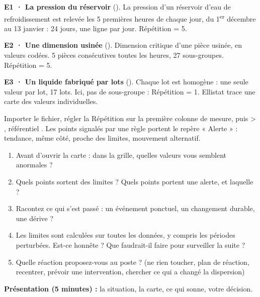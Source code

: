 \documentclass[10pt,a4paper]{article}
\begin{document}
\textbf{E1 · La pression du réservoir} (). La pression d'un réservoir d'eau de refroidissement est relevée les 5 premières heures de chaque jour, du 1\textsuperscript{er} décembre au 13 janvier : 24 jours, une ligne par jour. Répétition = 5.

\textbf{E2 · Une dimension usinée} (). Dimension critique d'une pièce usinée, en valeurs codées. 5 pièces consécutives toutes les heures, 27 sous-groupes. Répétition = 5.

\textbf{E3 · Un liquide fabriqué par lots} (). Chaque lot est homogène : une seule valeur par lot, 17 lots. Ici, pas de sous-groupe : Répétition = 1. Ellistat trace une carte des valeurs individuelles.

\begin{tcolorbox}[pas]
Importer le fichier, régler la Répétition sur la première colonne de mesure, puis  > , référentiel . Les points signalés par une règle portent le repère « Alerte » : tendance, même côté, proche des limites, mouvement alternatif.
\end{tcolorbox}

\begin{enumerate}[label=\textcolor{cyan}{\textbf{Q\arabic*.}},leftmargin=22pt]
\item Avant d'ouvrir la carte : dans la grille, quelles valeurs vous semblent anormales ?\reponse
\item Quels points sortent des limites ? Quels points portent une alerte, et laquelle ?\reponse[2]
\item Racontez ce qui s'est passé : un événement ponctuel, un changement durable, une dérive ?\reponse[2]
\item Les limites sont calculées sur toutes les données, y compris les périodes perturbées. Est-ce honnête ? Que faudrait-il faire pour surveiller la suite ?\reponse[2]
\item Quelle réaction proposez-vous au poste ? (ne rien toucher, plan de réaction, recentrer, prévoir une intervention, chercher ce qui a changé la dispersion)\reponse[2]
\end{enumerate}

\textbf{Présentation (5 minutes) :} la situation, la carte, ce qui sonne, votre décision.

\newpage
\label{s3}
\end{document}
